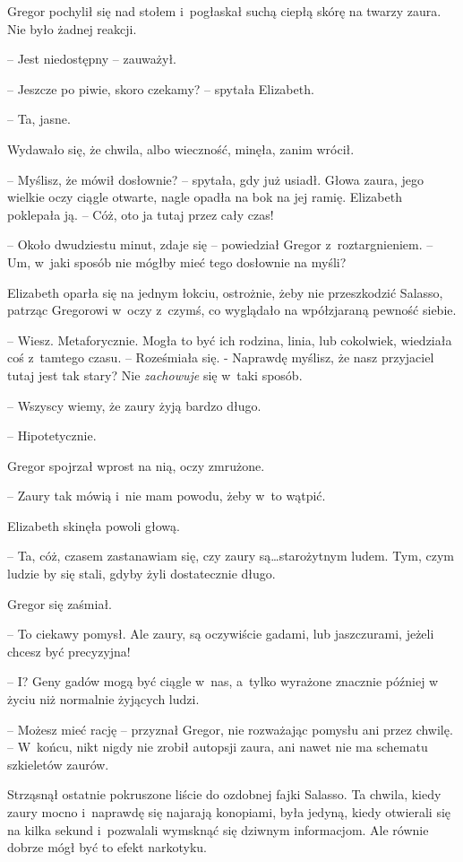 \documentclass[oneside,polish,12pt,sfheadings]{mwbk}
\begin{document}
Gregor pochylił się nad stołem i~pogłaskał suchą ciepłą skórę na twarzy
zaura. Nie było żadnej reakcji.

-- Jest niedostępny -- zauważył.

-- Jeszcze po piwie, skoro czekamy? -- spytała Elizabeth.

-- Ta, jasne.

Wydawało się, że chwila, albo wieczność, minęła, zanim wrócił.

-- Myślisz, że mówił dosłownie? -- spytała, gdy już usiadł. Głowa zaura,
jego wielkie oczy ciągle otwarte, nagle opadła na bok na jej ramię.
Elizabeth poklepała ją. -- Cóż, oto ja tutaj przez cały czas!

-- Około dwudziestu minut, zdaje się -- powiedział Gregor z~roztargnieniem. -- Um, w~jaki sposób nie mógłby mieć tego dosłownie na
myśli?

Elizabeth oparła się na jednym łokciu, ostrożnie, żeby nie przeszkodzić
Salasso, patrząc Gregorowi w~oczy z~czymś, co wyglądało na wpółzjaraną
pewność siebie. 

-- Wiesz. Metaforycznie. Mogła to być ich rodzina, linia,
lub cokolwiek, wiedziała coś z~tamtego czasu. -- Roześmiała się. -
Naprawdę myślisz, że nasz przyjaciel tutaj jest tak stary? Nie
\emph{zachowuje }się w~taki sposób.

-- Wszyscy wiemy, że zaury żyją bardzo długo.

-- Hipotetycznie.

Gregor spojrzał wprost na nią, oczy zmrużone. 

-- Zaury tak mówią i~nie
mam powodu, żeby w~to wątpić.

Elizabeth skinęła powoli głową. 

-- Ta, cóż, czasem zastanawiam się, czy
zaury są\ldots starożytnym ludem. Tym, czym ludzie by się stali, gdyby żyli
dostatecznie długo.

Gregor się zaśmiał. 

-- To ciekawy pomysł. Ale zaury, są oczywiście
gadami, lub jaszczurami, jeżeli chcesz być precyzyjna!

-- I? Geny gadów mogą być ciągle w~nas, a~tylko wyrażone znacznie później
w życiu niż normalnie żyjących ludzi.

-- Możesz mieć rację -- przyznał Gregor, nie rozważając pomysłu ani przez
chwilę. -- W~końcu, nikt nigdy nie zrobił autopsji zaura, ani nawet nie
ma schematu szkieletów zaurów.

Strząsnął ostatnie pokruszone liście do ozdobnej fajki Salasso. Ta
chwila, kiedy zaury mocno i~naprawdę się najarają konopiami, była
jedyną, kiedy otwierali się na kilka sekund i~pozwalali wymsknąć się
dziwnym informacjom. Ale równie dobrze mógł być to efekt narkotyku.
\end{document}
